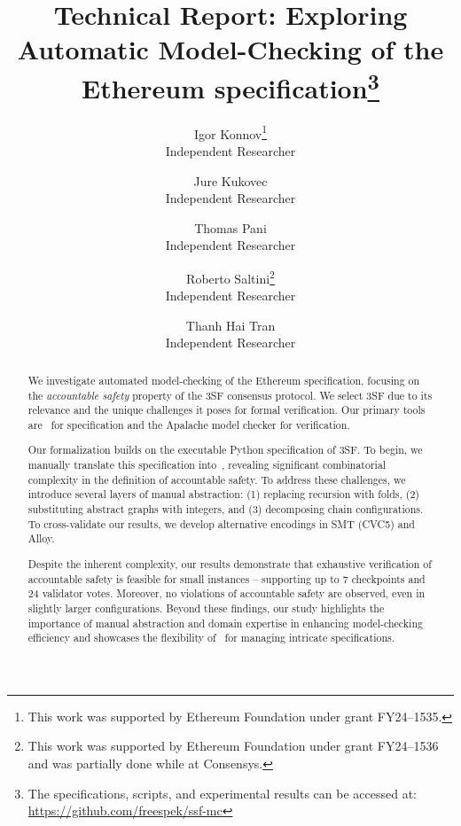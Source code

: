 \documentclass[12pt]{article}
\title{\vspace{-2em}Technical Report: Exploring Automatic Model-Checking of the Ethereum specification\footnote{%
		The specifications, scripts, and experimental results can be accessed at: \url{https://github.com/freespek/ssf-mc}}}
\author{%
    Igor Konnov\thanks{This work was supported by Ethereum Foundation
    under grant FY24--1535.}\\ \footnotesize Independent Researcher%
    \and
    Jure Kukovec\footnotemark[2] \\ \footnotesize Independent Researcher%
    \and
    Thomas Pani\footnotemark[2] \\ \footnotesize Independent Researcher%
    \and
    Roberto Saltini\thanks{This work was supported by Ethereum Foundation
    under grant FY24--1536 and was partially done while at Consensys.} \\
    \footnotesize Independent Researcher%
    \and
    Thanh Hai Tran\footnotemark[3] \\ \footnotesize Independent Researcher%
}
\date{}
\begin{document}
\maketitle

\begin{abstract}%
We investigate automated model-checking of the Ethereum specification, focusing
on the \emph{accountable safety} property of the 3SF consensus protocol. We
select 3SF due to its relevance and the unique challenges it poses for formal
verification. Our primary tools are~\tlap{} for specification and the Apalache
model checker for verification.

Our formalization builds on the executable Python specification of 3SF\@. To
begin, we manually translate this specification into~\tlap{}, revealing
significant combinatorial complexity in the definition of accountable safety.
To address these challenges, we introduce several layers of manual abstraction:
(1) replacing recursion with folds, (2) substituting abstract graphs with
integers, and (3) decomposing chain configurations.
To cross-validate our results, we develop alternative encodings in SMT (CVC5)
and Alloy.

Despite the inherent complexity, our results demonstrate that exhaustive
verification of accountable safety is feasible for small instances --
supporting up to 7 checkpoints and 24 validator votes. Moreover, no violations
of accountable safety are observed, even in slightly larger configurations.
Beyond these findings, our study highlights the importance of manual
abstraction and domain expertise in enhancing model-checking efficiency and
showcases the flexibility of~\tlap{} for managing intricate specifications.%
\end{abstract}%
\newpage%

\setcounter{tocdepth}{2}  %
\tableofcontents















\end{document}
